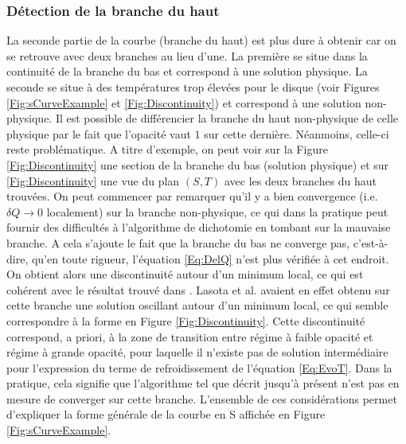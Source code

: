 \documentclass[a4paper,12pt]{article}
\begin{document}
         \subsubsection{Détection de la branche du haut}
            \label{Sec:Find_branche_du_haut}
            La seconde partie de la courbe (branche du haut) est plus dure à obtenir car on se retrouve avec deux branches au lieu d'une. La première se situe dans la continuité de la branche du bas et correspond à une solution physique. La seconde se situe à des températures trop élevées pour le disque (voir Figures \ref{Fig:sCurveExample}\protect{} et \ref{Fig:Discontinuity}\protect{}) et correspond à une solution non-physique.
            Il est possible de différencier la branche du haut non-physique de celle physique par le fait que l'opacité vaut $1$ sur cette dernière. Néanmoins, celle-ci reste problématique. A titre d'exemple, on peut voir sur la Figure \ref{Fig:Discontinuity}\protect{} une section de la branche du bas (solution physique) et sur \ref{Fig:Discontinuity}\protect{} une vue du plan $(S,T)$ avec les deux branches du haut trouvées.\newline
            On peut commencer par remarquer qu'il y a bien convergence (i.e. $\delta Q \rightarrow 0$ localement) sur la branche non-physique, ce qui dans la pratique peut fournir des difficultés à l'algorithme de dichotomie en tombant sur la mauvaise branche. A cela s'ajoute le fait que la branche du bas ne converge pas, c'est-à-dire, qu'en toute rigueur, l'équation \ref{Eq:DelQ} n'est plus vérifiée à cet endroit. On obtient alors une discontinuité autour d'un minimum local, ce qui est cohérent avec le résultat trouvé dans \cite{PapierAccretion}. Lasota et al. avaient en effet obtenu sur cette branche une solution oscillant autour d'un minimum local, ce qui semble correspondre à la forme en Figure \ref{Fig:Discontinuity}. Cette discontinuité correspond, a priori, à la zone de transition entre régime à faible opacité et régime à grande opacité, pour laquelle il n'existe pas de solution intermédiaire pour l'expression du terme de refroidissement de l'équation \ref{Eq:EvoT}.\newline
            Dans la pratique, cela signifie que l'algorithme tel que décrit jusqu'à présent n'est pas en mesure de converger sur cette branche. L'ensemble de ces considérations permet d'expliquer la forme générale de la courbe en S affichée en Figure \ref{Fig:sCurveExample}.
            
\end{document}
